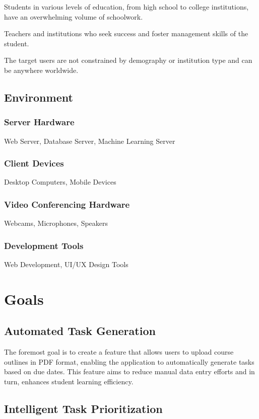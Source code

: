 \documentclass{article}
\begin{document}
    Students in various levels of education, from high school to college institutions, have an overwhelming volume of schoolwork. 

    Teachers and institutions who seek success and foster management skills of the student.

    The target users are not constrained by demography or institution type and can be anywhere worldwide.

\subsection{Environment}
\subsubsection{Server Hardware}
Web Server, Database Server, Machine Learning Server
\subsubsection{Client Devices}
Desktop Computers, Mobile Devices
\subsubsection{Video Conferencing Hardware}
Webcams, Microphones, Speakers

\subsubsection{Development Tools}
Web Development, UI/UX Design Tools
\section{Goals}

    \subsection{Automated Task Generation}
    
    The foremost goal is to create a feature that allows users to upload course outlines in PDF format, enabling the application to automatically generate tasks based on due dates. This feature aims to reduce manual data entry efforts and in turn, enhances student learning efficiency.
       
    \subsection{Intelligent Task Prioritization}
\end{document}
